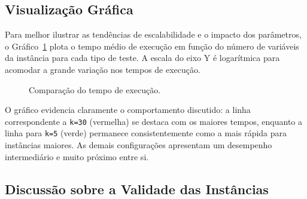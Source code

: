 \subsection{Visualização Gráfica}

Para melhor ilustrar as tendências de escalabilidade e o impacto dos parâmetros, o Gráfico~\ref{fig:grafico-resultados} plota o
tempo médio de execução em função do número de variáveis da instância para cada tipo de teste. A escala do eixo Y é logarítmica
para acomodar a grande variação nos tempos de execução.

\begin{figure}[ht!]
    \centering
    \caption{Comparação do tempo de execução.}
    \label{fig:grafico-resultados}
\end{figure}

O gráfico evidencia claramente o comportamento discutido: a linha correspondente a \texttt{k=30} (vermelha) se destaca com os maiores
tempos, enquanto a linha para \texttt{k=5} (verde) permanece consistentemente como a mais rápida para instâncias maiores. As demais configurações
apresentam um desempenho intermediário e muito próximo entre si.


\subsection{Discussão sobre a Validade das Instâncias}

